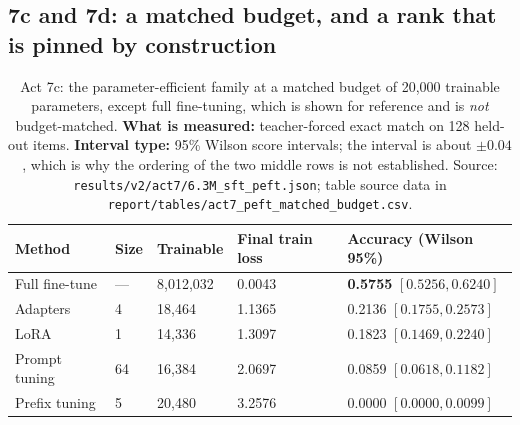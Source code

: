 \documentclass[11pt,a4paper]{article}
\begin{document}
\subsection{7c and 7d: a matched budget, and a rank that is pinned by
construction}
\label{sec:act7cd}

\begin{table}[H]
\centering
\begin{tabular}{L{2.8cm}R{2.2cm}R{2.8cm}R{2.4cm}R{2.4cm}}
\toprule
Method & Size & Trainable & Final train loss & Accuracy (Wilson 95\%) \\
\midrule
Full fine-tune & --- & 8,012,032 & 0.0043 & \textbf{0.5755} $[0.5256, 0.6240]$ \\
Adapters & 4 & 18,464 & 1.1365 & 0.2136 $[0.1755, 0.2573]$ \\
LoRA & 1 & 14,336 & 1.3097 & 0.1823 $[0.1469, 0.2240]$ \\
Prompt tuning & 64 & 16,384 & 2.0697 & 0.0859 $[0.0618, 0.1182]$ \\
Prefix tuning & 5 & 20,480 & 3.2576 & 0.0000 $[0.0000, 0.0099]$ \\
\bottomrule
\end{tabular}
\caption{Act 7c: the parameter-efficient family at a matched budget of 20,000
trainable parameters, except full fine-tuning, which is shown for reference and
is \emph{not} budget-matched. \textbf{What is measured:} teacher-forced exact
match on 128 held-out items. \textbf{Interval type:} 95\% Wilson score
intervals; the interval is about $\pm 0.04$, which is why the ordering of the
two middle rows is not established. Source:
\texttt{results/v2/act7/6.3M\_sft\_peft.json}; table source data in
\texttt{report/tables/act7\_peft\_matched\_budget.csv}.}
\label{tab:act7c}
\end{table}
\end{document}
